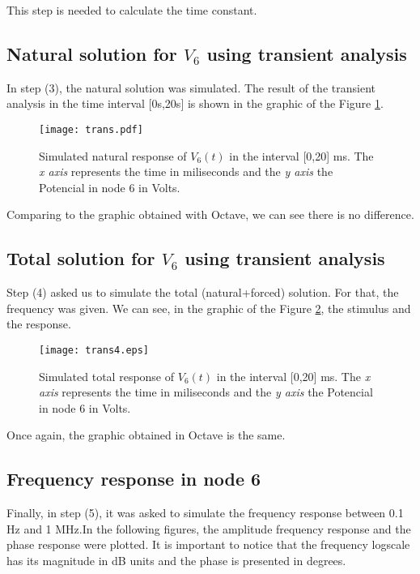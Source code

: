 This step is needed to calculate the time constant.

\subsection{Natural solution for $V_6$ using transient analysis}

In step (3), the natural solution was simulated. The result of the transient analysis in the time interval [0s,20s] is shown in the graphic of the Figure \ref{fig:sim_natural}.

\begin{figure}[H] \centering
\texttt{[image: trans.pdf]}
\caption{Simulated natural response of $V_6(t)$ in the interval [0,20] ms. The \textit{x axis} represents the time in miliseconds and the \textit{y axis} the Potencial in node 6  in Volts.  }
\label{fig:sim_natural}
\end{figure}

Comparing to the graphic obtained with Octave, we can see there is no difference. 

\subsection{Total solution for $V_6$ using transient analysis}

Step (4) asked us to simulate the total (natural+forced) solution. For that, the frequency was given. We can see, in the graphic of the Figure \ref{fig:sim_total}, the stimulus and the response.

\begin{figure}[H] \centering
\texttt{[image: trans4.eps]}
\caption{Simulated total response of $V_6(t)$ in the interval [0,20] ms. The \textit{x axis} represents the time in miliseconds and the \textit{y axis} the Potencial in node 6  in Volts.  }
\label{fig:sim_total}
\end{figure}

Once again, the graphic obtained in Octave is the same.

\subsection{Frequency response in node 6}

Finally, in step (5), it was asked to simulate the frequency response between 0.1 Hz and 1 MHz.In the following figures, the amplitude frequency response and the phase response were plotted. It is important to notice that the frequency logscale has its magnitude in dB units and the phase is presented in degrees.

